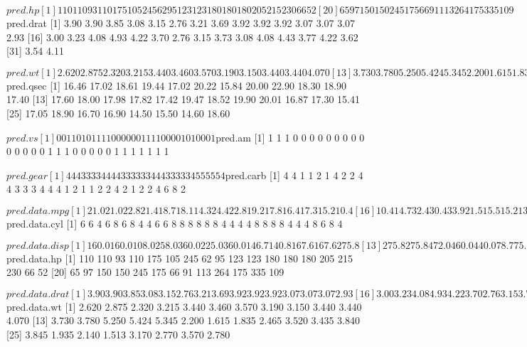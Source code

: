 \documentclass[a4paper]{article}
\begin{document}
\begin{Schunk}
\begin{Soutput}
$pred.hp
 [1] 110 110  93 110 175 105 245  62  95 123 123 180 180 180 205 215 230  66  52
[20]  65  97 150 150 245 175  66  91 113 264 175 335 109

$pred.drat
 [1] 3.90 3.90 3.85 3.08 3.15 2.76 3.21 3.69 3.92 3.92 3.92 3.07 3.07 3.07 2.93
[16] 3.00 3.23 4.08 4.93 4.22 3.70 2.76 3.15 3.73 3.08 4.08 4.43 3.77 4.22 3.62
[31] 3.54 4.11

$pred.wt
 [1] 2.620 2.875 2.320 3.215 3.440 3.460 3.570 3.190 3.150 3.440 3.440 4.070
[13] 3.730 3.780 5.250 5.424 5.345 2.200 1.615 1.835 2.465 3.520 3.435 3.840
[25] 3.845 1.935 2.140 1.513 3.170 2.770 3.570 2.780

$pred.qsec
 [1] 16.46 17.02 18.61 19.44 17.02 20.22 15.84 20.00 22.90 18.30 18.90 17.40
[13] 17.60 18.00 17.98 17.82 17.42 19.47 18.52 19.90 20.01 16.87 17.30 15.41
[25] 17.05 18.90 16.70 16.90 14.50 15.50 14.60 18.60

$pred.vs
 [1] 0 0 1 1 0 1 0 1 1 1 1 0 0 0 0 0 0 1 1 1 1 0 0 0 0 1 0 1 0 0 0 1

$pred.am
 [1] 1 1 1 0 0 0 0 0 0 0 0 0 0 0 0 0 0 1 1 1 0 0 0 0 0 1 1 1 1 1 1 1

$pred.gear
 [1] 4 4 4 3 3 3 3 4 4 4 4 3 3 3 3 3 3 4 4 4 3 3 3 3 3 4 5 5 5 5 5 4

$pred.carb
 [1] 4 4 1 1 2 1 4 2 2 4 4 3 3 3 4 4 4 1 2 1 1 2 2 4 2 1 2 2 4 6 8 2

$pred.data.mpg
 [1] 21.0 21.0 22.8 21.4 18.7 18.1 14.3 24.4 22.8 19.2 17.8 16.4 17.3 15.2 10.4
[16] 10.4 14.7 32.4 30.4 33.9 21.5 15.5 15.2 13.3 19.2 27.3 26.0 30.4 15.8 19.7
[31] 15.0 21.4

$pred.data.cyl
 [1] 6 6 4 6 8 6 8 4 4 6 6 8 8 8 8 8 8 4 4 4 4 8 8 8 8 4 4 4 8 6 8 4

$pred.data.disp
 [1] 160.0 160.0 108.0 258.0 360.0 225.0 360.0 146.7 140.8 167.6 167.6 275.8
[13] 275.8 275.8 472.0 460.0 440.0  78.7  75.7  71.1 120.1 318.0 304.0 350.0
[25] 400.0  79.0 120.3  95.1 351.0 145.0 301.0 121.0

$pred.data.hp
 [1] 110 110  93 110 175 105 245  62  95 123 123 180 180 180 205 215 230  66  52
[20]  65  97 150 150 245 175  66  91 113 264 175 335 109

$pred.data.drat
 [1] 3.90 3.90 3.85 3.08 3.15 2.76 3.21 3.69 3.92 3.92 3.92 3.07 3.07 3.07 2.93
[16] 3.00 3.23 4.08 4.93 4.22 3.70 2.76 3.15 3.73 3.08 4.08 4.43 3.77 4.22 3.62
[31] 3.54 4.11

$pred.data.wt
 [1] 2.620 2.875 2.320 3.215 3.440 3.460 3.570 3.190 3.150 3.440 3.440 4.070
[13] 3.730 3.780 5.250 5.424 5.345 2.200 1.615 1.835 2.465 3.520 3.435 3.840
[25] 3.845 1.935 2.140 1.513 3.170 2.770 3.570 2.780


\end{Soutput}
\end{Schunk}
\end{document}
